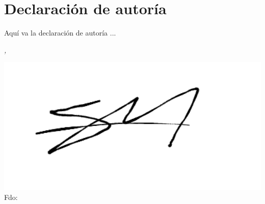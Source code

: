 %
\chapter*{Declaración de autoría}
\label{sec:declaracion}

Aquí va la declaración de autoría ...

\bigskip

\noindent\textit{\thesisUniversityCity, \thesisDate}

\smallskip

\begin{flushright}
	\begin{minipage}{5cm}
	    \includegraphics[width=1\textwidth]{figuras/misc/Sergio.png}
		\centering Fdo: \thesisName
	\end{minipage}
\end{flushright}

